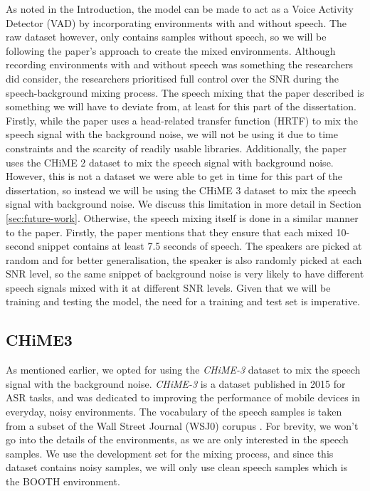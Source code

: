 \documentclass[logo,bsc,singlespacing,parskip,online]{infthesis}
\newcommand{\chime}[1]{\textit{CHiME-#1}\xspace}
\begin{document}
As noted in the Introduction, the model can be made to act as a Voice Activity Detector (VAD) by incorporating environments with and without speech.
The raw dataset however, only contains samples without speech, so we will be following the paper's approach to create the mixed environments.
Although recording environments with and without speech was something the researchers did consider, the researchers prioritised full control over the SNR during the speech-background mixing process.
The speech mixing that the paper described is something we 
will have to deviate from, at least for this part of the dissertation.
Firstly, while the paper uses a head-related transfer function (HRTF) to mix the speech signal with the background noise,
we will not be using it due to time constraints and the scarcity of readily usable libraries.
Additionally, the paper uses the CHiME 2 dataset \citep{vincent_second_2013} to mix the speech signal with background noise.
However, this is not a dataset we were able to get in time for this part 
of the dissertation, so instead we will be using the CHiME 3 dataset \citep{barker_third_2015} to mix the speech signal with background noise.
We discuss this limitation in more detail in Section \ref{sec:future-work}.
Otherwise, the speech mixing itself is done in a similar manner to the paper.
Firstly, the paper mentions that they ensure that each mixed 10-second snippet contains at least 7.5 seconds of speech.
The speakers are picked at random and for better generalisation, the speaker is also randomly 
picked at each SNR level, so the same snippet of background noise is very likely 
to have different speech signals mixed with it at different SNR levels.
Given that we will be training and testing the model, the need for a training and test set is imperative. 

\subsection{CHiME3}
 As mentioned earlier, we opted for using the \chime{3} dataset to mix the speech signal with the background noise. 
\chime{3} is a dataset published in 2015 for ASR tasks, and was dedicated to improving the performance of mobile devices 
in everyday, noisy environments. The vocabulary of the speech samples is taken from a subset of the Wall Street Journal (WSJ0) corupus \cite{wsj0}.
For brevity, we won't go into the details of the environments, as we 
are only interested in the speech samples. 
We use the development set for the mixing process,
and since this dataset contains noisy samples, we will only use clean speech samples 
which is the BOOTH environment.
\end{document}
